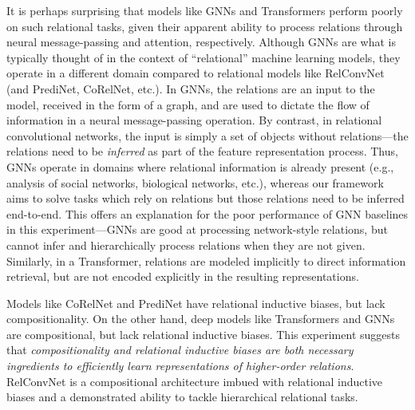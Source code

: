 It is perhaps surprising that models like GNNs and Transformers perform poorly on such relational tasks, given their apparent ability to process relations through neural message-passing and attention, respectively. Although GNNs are what is typically thought of in the context of ``relational'' machine learning models, they operate in a different domain compared to relational models like RelConvNet (and PrediNet, CoRelNet, etc.). In GNNs, the relations are an input to the model, received in the form of a graph, and are used to dictate the flow of information in a neural message-passing operation. By contrast, in relational convolutional networks, the input is simply a set of objects without relations---the relations need to be \textit{inferred} as part of the feature representation process. Thus, GNNs operate in domains where relational information is already present (e.g., analysis of social networks, biological networks, etc.), whereas our framework aims to solve tasks which rely on relations but those relations need to be inferred end-to-end. This offers an explanation for the poor performance of GNN baselines in this experiment---GNNs are good at processing network-style relations, but cannot infer and hierarchically process relations when they are not given. Similarly, in a Transformer, relations are modeled implicitly to direct information retrieval, but are not encoded explicitly in the resulting representations.

Models like CoRelNet and PrediNet have relational inductive biases, but lack compositionality. On the other hand, deep models like Transformers and GNNs are compositional, but lack relational inductive biases. This experiment suggests that \textit{compositionality and relational inductive biases are both necessary ingredients to efficiently learn representations of higher-order relations}. RelConvNet is a compositional architecture imbued with relational inductive biases and a demonstrated ability to tackle hierarchical relational tasks.